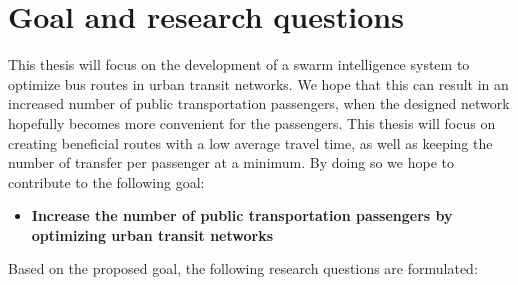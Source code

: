 \section{Goal and research questions}
\label{sec:goalAndResearchQuestions}
This thesis will focus on the development of a swarm intelligence system to optimize bus routes in urban transit networks. We hope that this can result in an increased number of public transportation passengers, when the designed network hopefully becomes more convenient for the passengers. This thesis will focus on creating beneficial routes with a low average travel time, as well as keeping the number of transfer per passenger at a minimum. By doing so we hope to contribute to the following goal: 

\begin{itemize}
\item \label{itm:goal} \textbf{Increase the number of public transportation passengers by optimizing urban transit networks}
\end{itemize}

Based on the proposed goal, the following research questions are formulated: 

